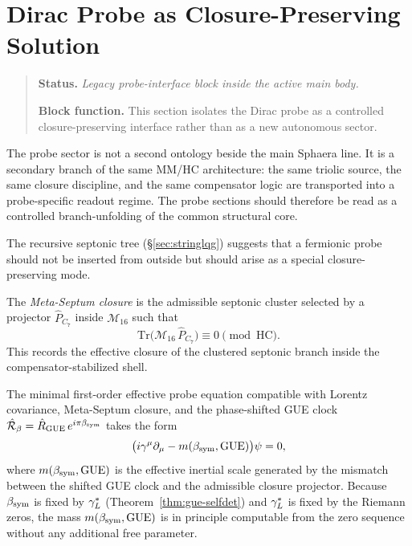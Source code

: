 \section{Dirac Probe as Closure-Preserving Solution}
\begin{quote}\small
\noindent\textbf{Status.} \emph{Legacy probe-interface block inside the active main body.}\par
\noindent\textbf{Block function.} This section isolates the Dirac probe as a controlled closure-preserving interface rather than as a new autonomous sector.
\end{quote}
\label{sec:dirac-probe}

\begin{remark}
The probe sector is not a second ontology beside the main Sphaera line.
It is a secondary branch of the same MM/HC architecture: the same
triolic source, the same closure discipline, and the same compensator
logic are transported into a probe-specific readout regime. The probe
sections should therefore be read as a controlled branch-unfolding of
the common structural core.
\end{remark}

\begin{remark}
The recursive septonic tree (§\ref{sec:stringlqg}) suggests that
a fermionic probe should not be inserted from outside but should arise
as a special closure-preserving mode.
\end{remark}

\begin{definition}
The \emph{Meta-Septum closure} is the admissible septonic cluster
selected by a projector $\hat P_{C_7}$ inside $\mathcal{M}_{16}$ such
that
\[
  \mathrm{Tr}\!\bigl(\mathcal{M}_{16}\,\hat P_{C_7}\bigr)
  \equiv 0\pmod{\mathrm{HC}}.
\]
This records the effective closure of the clustered septonic branch
inside the compensator-stabilized shell.
\end{definition}

\begin{theorem}\label{thm:dirac-probe}
The minimal first-order effective probe equation compatible with Lorentz
covariance, Meta-Septum closure, and the phase-shifted GUE clock
$\hat{\mathcal{R}}_\beta = \hat R_{\mathrm{GUE}}\,e^{i\pi\beta_{\mathrm{sym}}}$
takes the form
\[
  \bigl(i\gamma^\mu\partial_\mu
        - m(\beta_{\mathrm{sym}},\mathrm{GUE})\bigr)\psi = 0,
\]
where $m(\beta_{\mathrm{sym}},\mathrm{GUE})$ is the effective inertial scale generated
by the mismatch between the shifted GUE clock and the admissible closure
projector.
Because $\beta_{\mathrm{sym}}$ is fixed by $\gamma_L^*$ (Theorem~\ref{thm:gue-selfdet}) and
$\gamma_L^*$ is fixed by the Riemann zeros, the mass $m(\beta_{\mathrm{sym}},\mathrm{GUE})$
is in principle computable from the zero sequence without any additional
free parameter.
\end{theorem}

